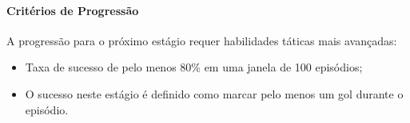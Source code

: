 \paragraph{Critérios de Progressão}

A progressão para o próximo estágio requer habilidades táticas mais avançadas:
\begin{itemize}
    \item Taxa de sucesso de pelo menos 80\% em uma janela de 100 episódios;
    \item O sucesso neste estágio é definido como marcar pelo menos um gol durante o episódio.
\end{itemize}








